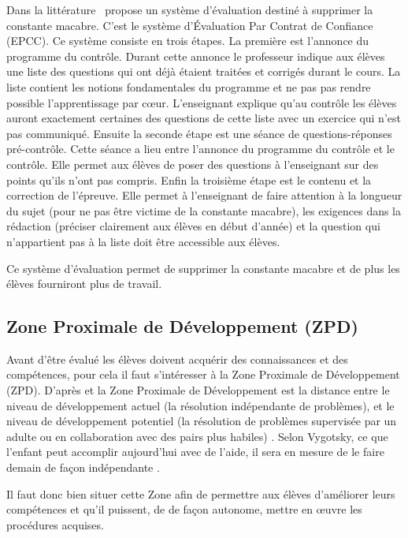 Dans la littérature~\cite{antibi2007notes} propose un système d'évaluation destiné à supprimer la constante macabre.
C'est le système d'Évaluation Par Contrat de Confiance (EPCC).
Ce système consiste en trois étapes. La première est l'annonce du programme du contrôle.
Durant cette annonce le professeur indique aux élèves une liste des questions qui ont déjà étaient traitées et corrigés durant le cours.
La liste contient les notions fondamentales du programme et ne pas pas rendre possible l'apprentissage par cœur.
L'enseignant explique qu'au contrôle les élèves auront exactement certaines des questions de cette liste avec un exercice qui n'est pas communiqué.
Ensuite la seconde étape est une séance de questions-réponses pré-contrôle.
Cette séance a lieu entre l'annonce du programme du contrôle et le contrôle.
Elle permet aux élèves de poser des questions à l'enseignant sur des points qu'ils n'ont pas compris.
Enfin la troisième étape est le contenu et la correction de l'épreuve.
Elle permet à l'enseignant de faire attention à la longueur du sujet (pour ne pas être victime de la constante macabre), les exigences dans la rédaction (préciser clairement aux élèves en début d'année) et la question qui n'appartient pas à la liste doit être accessible aux élèves.

Ce système d'évaluation permet de supprimer la constante macabre et de plus les élèves fourniront plus de travail.


\subsection{Zone Proximale de Développement (ZPD)}

Avant d'être évalué les élèves doivent acquérir des connaissances et des compétences, pour cela il faut s'intéresser à la Zone Proximale de Développement (ZPD).
D'après \cite{vygotsky1978interaction} et \cite{bodrova2011outils} la Zone Proximale de Développement est \og la distance entre le niveau de développement actuel (la résolution indépendante de problèmes), et le niveau de développement potentiel (la résolution de problèmes supervisée par un adulte ou en collaboration avec des pairs plus habiles) \fg.
 \og Selon Vygotsky, ce que l'enfant peut accomplir aujourd'hui avec de l'aide, il sera en mesure de le faire demain de façon indépendante \fg{} \cite{vygotsky1987zone}\cite{bodrova2011outils}.

Il faut donc bien situer cette Zone afin de permettre aux élèves d'améliorer leurs compétences et qu'il puissent, de  de façon autonome, mettre en œuvre les procédures acquises.






